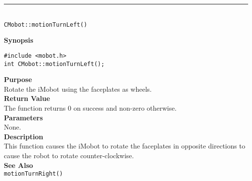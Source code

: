 \noindent
\vspace{5pt}
\rule{4.5in}{0.015in}\\
\noindent
{\LARGE \texttt{CMobot::motionTurnLeft()}}\\
{}

\noindent
{\bf Synopsis}\\
\begin{verbatim}
#include <mobot.h>
int CMobot::motionTurnLeft();
\end{verbatim}

\noindent
{\bf Purpose}\\
Rotate the iMobot using the faceplates as wheels.\\

\noindent
{\bf Return Value}\\
The function returns 0 on success and non-zero otherwise.\\

\noindent
{\bf Parameters}\\
None.\\

\noindent
{\bf Description}\\
This function causes the iMobot to rotate the faceplates in opposite directions
to cause the robot to rotate counter-clockwise.\\

\noindent
{\bf See Also}\\
\texttt{motionTurnRight()}

